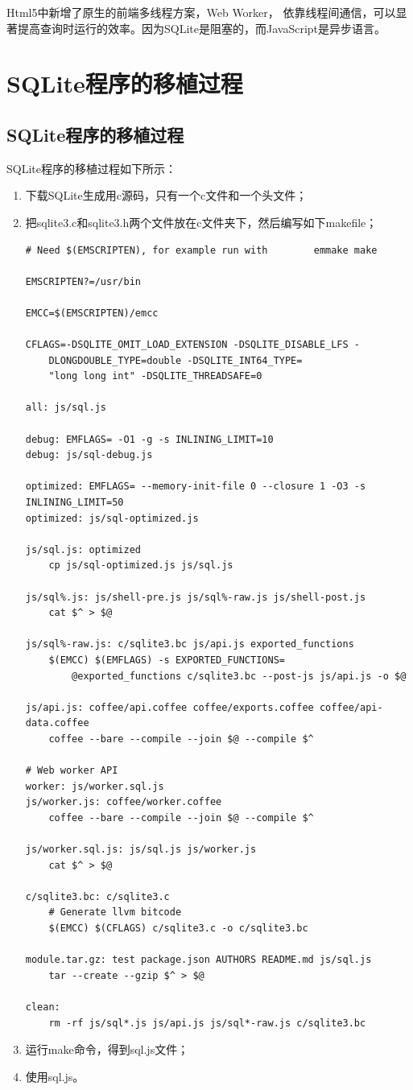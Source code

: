 Html5中新增了原生的前端多线程方案，Web Worker，
依靠线程间通信，可以显著提高查询时运行的效率。因为SQLite是阻塞的，而JavaScript是异步语言。

\section{SQLite程序的移植过程}

\subsection{SQLite程序的移植过程}

SQLite程序的移植过程如下所示：

\begin{enumerate}[itemindent=2em]
    \item 下载SQLite生成用c源码，只有一个c文件和一个头文件；
    \item 把sqlite3.c和sqlite3.h两个文件放在c文件夹下，然后编写如下makefile；
\begin{verbatim}
# Need $(EMSCRIPTEN), for example run with        emmake make

EMSCRIPTEN?=/usr/bin

EMCC=$(EMSCRIPTEN)/emcc

CFLAGS=-DSQLITE_OMIT_LOAD_EXTENSION -DSQLITE_DISABLE_LFS -
	DLONGDOUBLE_TYPE=double -DSQLITE_INT64_TYPE=
	"long long int" -DSQLITE_THREADSAFE=0

all: js/sql.js

debug: EMFLAGS= -O1 -g -s INLINING_LIMIT=10 
debug: js/sql-debug.js

optimized: EMFLAGS= --memory-init-file 0 --closure 1 -O3 -s INLINING_LIMIT=50
optimized: js/sql-optimized.js

js/sql.js: optimized
	cp js/sql-optimized.js js/sql.js

js/sql%.js: js/shell-pre.js js/sql%-raw.js js/shell-post.js
	cat $^ > $@

js/sql%-raw.js: c/sqlite3.bc js/api.js exported_functions
	$(EMCC) $(EMFLAGS) -s EXPORTED_FUNCTIONS=
		@exported_functions c/sqlite3.bc --post-js js/api.js -o $@

js/api.js: coffee/api.coffee coffee/exports.coffee coffee/api-data.coffee
	coffee --bare --compile --join $@ --compile $^

# Web worker API
worker: js/worker.sql.js
js/worker.js: coffee/worker.coffee
	coffee --bare --compile --join $@ --compile $^

js/worker.sql.js: js/sql.js js/worker.js
	cat $^ > $@

c/sqlite3.bc: c/sqlite3.c
	# Generate llvm bitcode
	$(EMCC) $(CFLAGS) c/sqlite3.c -o c/sqlite3.bc

module.tar.gz: test package.json AUTHORS README.md js/sql.js
	tar --create --gzip $^ > $@

clean:
	rm -rf js/sql*.js js/api.js js/sql*-raw.js c/sqlite3.bc
\end{verbatim}    	
	\item 运行make命令，得到sql.js文件；
	\item 使用sql.js。
\end{enumerate}



